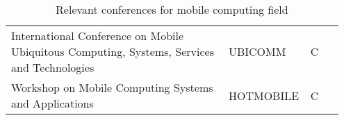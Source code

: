 \documentclass{article}
\begin{document}
\begin{table}[t]
\begin{tabular}{C{0.65\linewidth}C{0.2\linewidth}C{0.1\linewidth}}
International Conference on Mobile Ubiquitous Computing, Systems, Services and Technologies            & UBICOMM                              & C                                 \\
\cmidrule(l){1-3}



Workshop on Mobile Computing Systems and Applications                                                  & HOTMOBILE                            & C                                 \\ \bottomrule
\end{tabular}
\caption{Relevant conferences for mobile computing field}
\label{tbl:conferences}
\end{table}
\end{document}
